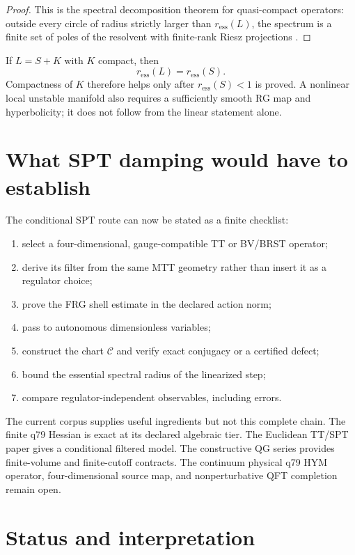 \documentclass[11pt]{article}
\theoremstyle{definition}
\theoremstyle{remark}
\newcommand{\Cmap}{\mathcal C}
\begin{document}
\begin{proof}
This is the spectral decomposition theorem for quasi-compact operators:
outside every circle of radius strictly larger than
\(r_{\mathrm{ess}}(L)\), the spectrum is a finite set of poles of the
resolvent with finite-rank Riesz projections \cite{Kato}.
\end{proof}

If \(L=S+K\) with \(K\) compact, then
\[
 r_{\mathrm{ess}}(L)=r_{\mathrm{ess}}(S).
\]
Compactness of \(K\) therefore helps only after
\(r_{\mathrm{ess}}(S)<1\) is proved. A nonlinear local unstable manifold
also requires a sufficiently smooth RG map and hyperbolicity; it does not
follow from the linear statement alone.

\section{What SPT damping would have to establish}

The conditional SPT route can now be stated as a finite checklist:

\begin{enumerate}
\item select a four-dimensional, gauge-compatible TT or BV/BRST operator;
\item derive its filter from the same MTT geometry rather than insert it as
a regulator choice;
\item prove the FRG shell estimate in the declared action norm;
\item pass to autonomous dimensionless variables;
\item construct the chart \(\Cmap\) and verify exact conjugacy or a certified
defect;
\item bound the essential spectral radius of the linearized step;
\item compare regulator-independent observables, including errors.
\end{enumerate}

The current corpus supplies useful ingredients but not this complete chain.
The finite q79 Hessian is exact at its declared algebraic tier. The
Euclidean TT/SPT paper gives a conditional filtered model. The constructive
QG series provides finite-volume and finite-cutoff contracts. The
continuum physical q79 HYM operator, four-dimensional source map, and
nonperturbative QFT completion remain open.

\section{Status and interpretation}
\end{document}

